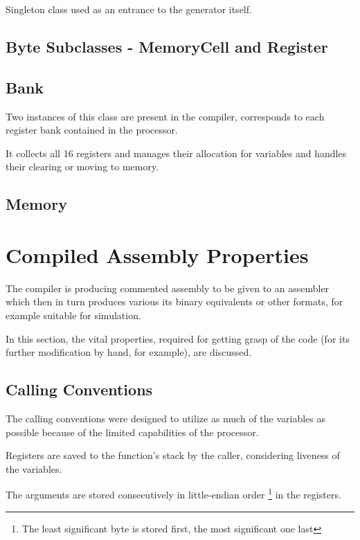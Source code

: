         Singleton class used as an entrance to the generator itself.

        \subsection{Byte Subclasses - MemoryCell and Register}

        \subsection{Bank}

        Two instances of this class are present in the compiler, corresponds to each register bank contained in the processor.

        It collects all 16 registers and manages their allocation for variables and handles their clearing or moving to memory.

        \subsection{Memory}

    \section{Compiled Assembly Properties}

    The compiler is producing commented assembly to be given to an assembler which then in turn produces various its binary equivalents or other formats, for example suitable for simulation.

    In this section, the vital properties, required for getting grasp of the code (for its further modification by hand, for example), are discussed.

        \subsection{Calling Conventions}

        The calling conventions were designed to utilize as much of the variables as possible because of the limited capabilities of the processor.

        Registers are saved to the function's stack by the caller, considering liveness of the variables.

        The arguments are stored consecutively in little-endian order \footnote{The least significant byte is stored first, the most significant one last} in the registers.

